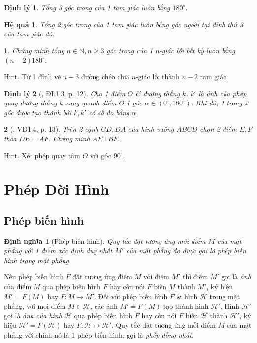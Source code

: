 \documentclass{article}
\newtheorem{baitoan}{}
\newtheorem{dinhly}{Định lý}
\newtheorem{dinhnghia}{Định nghĩa}
\newtheorem{hequa}{Hệ quả}
\begin{document}
\begin{dinhly}
	Tổng 3 góc trong của 1 tam giác luôn bằng $180^\circ$.
\end{dinhly}

\begin{hequa}
	Tổng 2 góc trong của 1 tam giác luôn bằng góc ngoài tại đỉnh thứ 3 của tam giác đó.
\end{hequa}

\begin{baitoan}
	Chứng minh tổng $n\in\mathbb{N},n\ge3$ góc trong của 1 $n$-giác lồi bất kỳ luôn bằng $(n - 2)180^\circ$.
\end{baitoan}
{\sf Hint.} Từ 1 đỉnh vẽ $n - 3$ đường chéo chia $n$-giác lồi thành $n - 2$ tam giác.

\begin{dinhly}[\cite{Pompe_phep_quay}, ĐL1.3, p. 12]
	Cho 1 điểm $O$ \& đường thẳng $k$. $k'$ là ảnh của phép quay đường thẳng $k$ xung quanh điểm $O$ 1 góc $\alpha\in(0^\circ,180^\circ)$. Khi đó, 1 trong 2 góc được tạo thành bởi $k,k'$ có số đo bằng $\alpha$.
\end{dinhly}

\begin{baitoan}[\cite{Pompe_phep_quay}, VD1.4, p. 13]
	Trên 2 cạnh $CD,DA$ của hình vuông $ABCD$ chọn 2 điểm $E,F$ thỏa $DE = AF$. Chứng minh $AE\bot BF$.
\end{baitoan}
{\sf Hint.} Xét phép quay tâm $O$ với góc $90^\circ$.


\section{Phép Dời Hình}

\subsection{Phép biến hình}

\begin{dinhnghia}[Phép biến hình]
	Quy tắc đặt tương ứng mỗi điểm $M$ của mặt phẳng với 1 điểm xác định duy nhất $M'$ của mặt phẳng đó được gọi là {\rm phép biến hình} trong mặt phẳng.
\end{dinhnghia}
Nếu phép biến hình $F$ đặt tương ứng điểm $M$ với điểm $M'$ thì điểm $M'$ gọi là {\it ảnh} của điểm $M$ qua phép biến hình $F$ hay còn nói $F$ biến $M$ thành $M'$, ký hiệu $M' = F(M)$ hay $F:M\mapsto M'$. Đối với phép biến hình $F$ \& hình $\mathcal{H}$ trong mặt phẳng, với mọi điểm $M\in\mathcal{H}$, các ảnh $M' = F(M)$ tạo thành hình $\mathcal{H}'$. Hình $\mathcal{H}'$ gọi là {\it ảnh của hình $\mathcal{H}$} qua phép biến hình $F$ hay còn nói $F$ biến $\mathcal{H}$ thành $\mathcal{H}'$, ký hiệu $\mathcal{H}' = F(\mathcal{H})$ hay $F:\mathcal{H}\mapsto\mathcal{H}'$. Quy tắc đặt tương ứng mỗi điểm $M$ của mặt phẳng với chính nó là 1 phép biến hình, gọi là {\it phép đồng nhất}.
\end{document}

